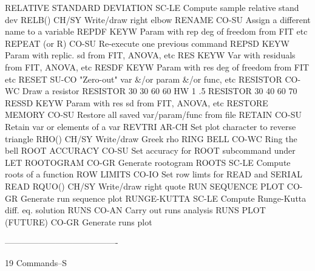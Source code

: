 RELATIVE STANDARD DEVIATION SC-LE Compute sample relative stand dev
RELB()                      CH/SY Write/draw right elbow
RENAME                      CO-SU Assign a different name to a variable
REPDF                       KEYW  Param with rep deg of freedom from FIT etc
REPEAT (or R)               CO-SU Re-execute one previous command
REPSD                       KEYW  Param with replic. sd from FIT, ANOVA, etc
RES                         KEYW  Var with residuals from FIT, ANOVA, etc
RESDF                       KEYW  Param with res deg of freedom from FIT etc
RESET                       SU-CO "Zero-out" var &/or param &/or func, etc
RESISTOR                    CO-WC Draw a resistor
                                  RESISTOR 30 30 60 60
                                  HW 1 .5
                                  RESISTOR 30 40 60 70
RESSD                       KEYW  Param with res sd from FIT, ANOVA, etc
RESTORE MEMORY              CO-SU Restore all saved var/param/func from file
RETAIN                      CO-SU Retain var or elements of a var
REVTRI                      AR-CH Set plot character to reverse triangle
RHO()                       CH/SY Write/draw Greek rho
RING BELL                   CO-WC Ring the bell
ROOT ACCURACY               CO-SU Set accuracy for ROOT subcommand under LET
ROOTOGRAM                   CO-GR Generate rootogram
ROOTS                       SC-LE Compute roots of a function
ROW LIMITS                  CO-IO Set row limts for READ and SERIAL READ
RQUO()                      CH/SY Write/draw right quote
RUN SEQUENCE PLOT           CO-GR Generate run sequence plot
RUNGE-KUTTA                 SC-LE Compute Runge-Kutta diff. eq. solution
RUNS                        CO-AN Carry out runs analysis
RUNS PLOT (FUTURE)          CO-GR Generate runs plot
 
----------------------------------------
 
19
Commands--S
 
